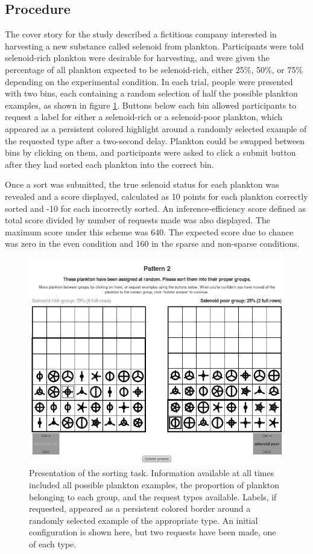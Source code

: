 \documentclass[10pt,letterpaper]{article}
\begin{document}
\subsection{Procedure}

The cover story for the study described a fictitious company interested in harvesting a new substance called selenoid from plankton. Participants were told selenoid-rich plankton were desirable for harvesting, and were given the percentage of all plankton expected to be selenoid-rich, either 25\%, 50\%, or 75\% depending on the experimental condition. In each trial, people were presented with two bins, each containing a random selection of half the possible plankton examples, as shown in figure \ref{screenshot}. Buttons below each bin allowed participants to request a label for either a selenoid-rich or a selenoid-poor plankton, which appeared as a persistent colored highlight around a randomly selected example of the requested type after a two-second delay. Plankton could be swapped between bins by clicking on them, and participants were asked to click a \textsf{submit} button after they had sorted each plankton into the correct bin.

 Once a sort was submitted, the true selenoid status for each plankton was revealed and a score displayed, calculated as 10 points for each plankton correctly sorted and -10 for each incorrectly sorted. An inference-efficiency score defined as total score divided by number of requests made was also displayed. The maximum score under this scheme was 640. The expected score due to chance was zero in the {\sc even} condition and 160 in the {\sc sparse} and {\sc non-sparse} conditions. 

\begin{figure}[t] %
\includegraphics[width=.5\textwidth]{screenshot_trimmed.png} %
\caption{Presentation of the sorting task. Information available at all times included all possible plankton examples, the proportion of plankton belonging to each group, and the request types available. Labels, if requested, appeared as a persistent colored border around a randomly selected example of the appropriate type. An initial configuration is shown here, but two requests have been made, one of each type.}
\label{screenshot}
\end{figure} %
\end{document}
